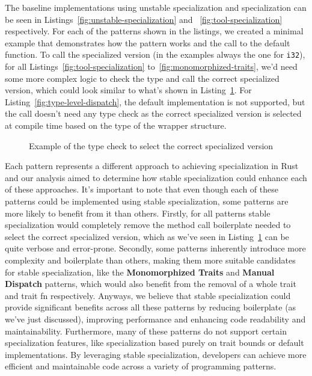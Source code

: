 The baseline implementations using unstable specialization and \mytool{} specialization can be seen in Listings~\ref{fig:unstable-specialization} and ~\ref{fig:tool-specialization} respectively.
For each of the patterns shown in the listings, we created a minimal example that demonstrates how the pattern works and the call to the default function.
To call the specialized version (in the examples always the one for \texttt{i32}), for all Listings~\ref{fig:tool-specialization} to~\ref{fig:monomorphized-traits}, we'd need some more complex logic to check the type and call the correct specialized version, which could look similar to what's shown in Listing~\ref{fig:call-check-type}.
For Listing~\ref{fig:type-level-dispatch}, the default implementation is not supported, but the call doesn't need any type check as the correct specialized version is selected at compile time based on the type of the wrapper structure.

\begin{figure}[htbp!]
	\centering
	\captionsetup{type=listing,skip=2pt}
	\caption{Example of the type check to select the correct specialized version}
	\label{fig:call-check-type}
\end{figure}

Each pattern represents a different approach to achieving specialization in Rust and our analysis aimed to determine how stable specialization could enhance each of these approaches.
It's important to note that even though each of these patterns could be implemented using stable specialization, some patterns are more likely to benefit from it than others.
Firstly, for all patterns stable specialization would completely remove the method call boilerplate needed to select the correct specialized version, which as we've seen in Listing~\ref{fig:call-check-type} can be quite verbose and error-prone.
Secondly, some patterns inherently introduce more complexity and boilerplate than others, making them more suitable candidates for stable specialization, like the \textbf{Monomorphized Traits} and \textbf{Manual Dispatch} patterns, which would also benefit from the removal of a whole trait and trait fn respectively.
Anyways, we believe that stable specialization could provide significant benefits across all these patterns by reducing boilerplate (as we've just discussed), improving performance and enhancing code readability and maintainability.
Furthermore, many of these patterns do not support certain specialization features, like specialization based purely on trait bounds or default implementations.
By leveraging stable specialization, developers can achieve more efficient and maintainable code across a variety of programming patterns.

